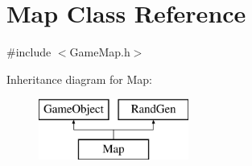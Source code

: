 \hypertarget{class_map}{}\section{Map Class Reference}
\label{class_map}


{\ttfamily \#include $<$Game\+Map.\+h$>$}

Inheritance diagram for Map\+:\begin{figure}[H]
\begin{center}
\leavevmode
\includegraphics[height=2.000000cm]{class_map}
\end{center}
\end{figure}
